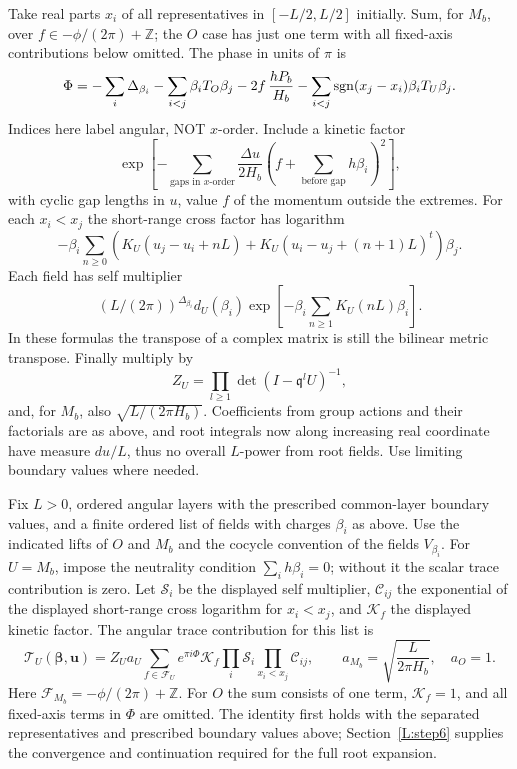 Take real parts \(x_i\) of all representatives in \([-L/2,L/2]\) initially. Sum, for \(M_b\), over \(f\in-\phi/(2\pi)+\mathbb Z\); the \(O\) case has just one term with all fixed-axis contributions below omitted. The phase in units of \(\pi\) is
\[
 \Phi=-\sum_i\Delta_{\beta_i}-\sum_{i<j}\beta_i T_O\beta_j
 -2 f\,\frac{hP_b}{H_b}
 -\sum_{i<j}{\rm sgn}(x_j-x_i)\beta_i T_U\beta_j.
\]
Indices here label angular, NOT \(x\)-order. Include a kinetic factor
\[
 \exp\left[-\sum_{\text{gaps in }x\text{-order}}\frac{\Delta u}{2H_b}
       \left(f+\sum_{\text{before gap}}h\beta_i\right)^2\right],
\]
with cyclic gap lengths in \(u\), value \(f\) of the momentum outside the extremes. For each \(x_i<x_j\) the short-range cross factor has logarithm
\[
 -\beta_i\sum_{n\ge0}\left(K_U(u_j-u_i+nL)
             +K_U(u_i-u_j+(n+1)L)^t\right)\beta_j.
\]
Each field has self multiplier
\[
 (L/(2\pi))^{\Delta_{\beta_i}}d_U(\beta_i)
     \exp\left[-\beta_i\sum_{n\ge1}K_U(nL)\beta_i\right].
\]
In these formulas the transpose of a complex matrix is still the bilinear metric transpose. Finally multiply by
\[
 Z_U=\prod_{l\ge1}\det(I-\mathfrak q^l U)^{-1},
\]
and, for \(M_b\), also \(\sqrt{L/(2\pi H_b)}\). Coefficients from group actions and their factorials are as above, and root integrals now along increasing real coordinate have measure \(du/L\), thus no overall \(L\)-power from root fields. Use limiting boundary values where needed.

\begin{proposition}\label{L:prop:scalar-channel}
Fix \(L>0\), ordered angular layers with the prescribed common-layer
boundary values, and a finite ordered list of fields
with charges \(\beta_i\) as above. Use the indicated lifts of \(O\) and
\(M_b\) and the cocycle convention of the fields \(V_{\beta_i}\).
For \(U=M_b\), impose the neutrality condition
\(\sum_i h\beta_i=0\); without it the scalar trace contribution is zero.
Let \(\mathcal S_i\) be the displayed self multiplier,
\(\mathcal C_{ij}\) the exponential of the displayed short-range cross
logarithm for \(x_i<x_j\), and \(\mathcal K_f\) the displayed kinetic
factor. The angular trace contribution for this list is
\begin{equation}\label{L:eq:scalar-channel}
 \mathcal T_U(\boldsymbol\beta,\boldsymbol u)
 =Z_U a_U\sum_{f\in\mathcal F_U}
   e^{\pi i\Phi}\mathcal K_f
   \prod_i\mathcal S_i\prod_{x_i<x_j}\mathcal C_{ij},
 \qquad
 a_{M_b}=\sqrt{\frac{L}{2\pi H_b}},\quad a_O=1.
\end{equation}
Here \(\mathcal F_{M_b}=-\phi/(2\pi)+\mathbb Z\).
For \(O\) the sum consists of one term, \(\mathcal K_f=1\), and all
fixed-axis terms in \(\Phi\) are omitted. The identity first holds with
the separated representatives and prescribed boundary values above;
Section~\ref{L:step6} supplies the convergence and continuation required
for the full root expansion.
\end{proposition}

